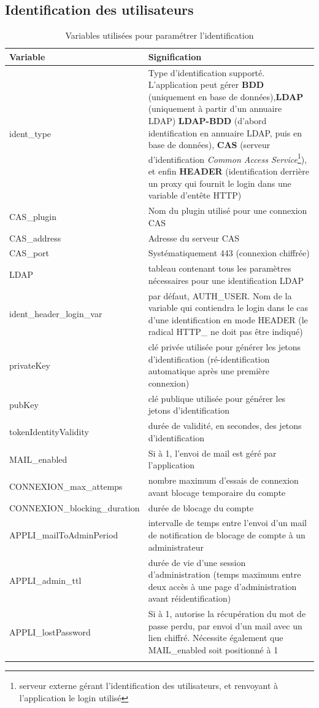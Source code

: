 \subsection{Identification des utilisateurs}

\begin{longtable}{|p{6cm}|p{10cm}|}
\hline
\textbf{Variable} & \textbf{Signification} \\
\hline
\endhead
ident\_type & Type d'identification supporté. L'application peut gérer \textbf{BDD} (uniquement en base de données),\textbf{LDAP} (uniquement à partir d'un annuaire LDAP) \textbf{LDAP-BDD} (d'abord identification en annuaire LDAP, puis en base de données), \textbf{CAS} (serveur d'identification \textit{Common Access Service}\footnote{serveur externe gérant l'identification des utilisateurs, et renvoyant à l'application le login utilisé}), et enfin \textbf{HEADER} (identification derrière un proxy qui fournit le login dans une variable d'entête HTTP)\\
\hline
CAS\_plugin & Nom du plugin utilisé pour une connexion CAS \\
\hline
CAS\_address & Adresse du serveur CAS\\
\hline
CAS\_port & Systématiquement 443 (connexion chiffrée)\\
\hline
LDAP & tableau contenant tous les paramètres nécessaires pour une identification LDAP \\
\hline
ident\_header\_login\_var & par défaut, AUTH\_USER. Nom de la variable qui contiendra le login dans le cas d'une identification en mode HEADER (le radical HTTP\_  ne doit pas être indiqué) \\
\hline
privateKey & clé privée utilisée pour générer les jetons d'identification (ré-identification automatique après une première connexion) \\
\hline
pubKey & clé publique utilisée pour générer les jetons d'identification \\
\hline
tokenIdentityValidity & durée de validité, en secondes, des jetons d'identification\\
\hline
MAIL\_enabled & Si à 1, l'envoi de mail est géré par l'application \\
\hline
CONNEXION\_max\_attemps & nombre maximum d'essais de connexion avant blocage temporaire du compte \\
\hline
CONNEXION\_blocking\_duration & durée de blocage du compte \\
\hline
APPLI\_mailToAdminPeriod & intervalle de temps entre l'envoi d'un mail de notification de blocage de compte à un administrateur \\
\hline
APPLI\_admin\_ttl & durée de vie d'une session d'administration (temps maximum entre deux accès à une page d'administration avant réidentification) \\
\hline
APPLI\_lostPassword & Si à 1, autorise la récupération du mot de passe perdu, par envoi d'un mail avec un lien chiffré. Nécessite également que MAIL\_enabled soit positionné à 1 \\
\hline

\caption{Variables utilisées pour paramétrer l'identification}
\end{longtable}

